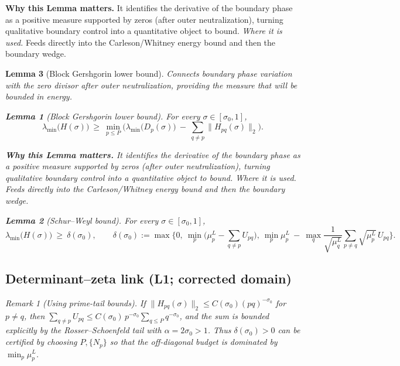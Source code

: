 \documentclass[11pt]{article}
\newtheorem{lemma}{Lemma}[section]
\theoremstyle{definition}
\theoremstyle{remark}
\newtheorem{remark}{Remark}[section]
\begin{document}
  
\vspace{1.0cm}
\noindent\textbf{Why this Lemma matters.} It identifies the derivative of the boundary phase as a positive measure supported by zeros (after outer neutralization), turning qualitative boundary control into a quantitative object to bound.
\noindent\textit{Where it is used.} Feeds directly into the Carleson/Whitney energy bound and then the boundary wedge.
\begin{lemma}[Block Gershgorin lower bound]
 Connects boundary phase variation with the zero divisor after outer neutralization, providing the measure that will be bounded in energy.
\begin{lemma}[Block Gershgorin lower bound]
\label{lem:block-gersh}
For every $\sigma\in[\sigma_0,1]$,
\[
  \lambda_{\min}\big(H(\sigma)\big)\ \ge\ \min_{p\le P}\Big(\lambda_{\min}\big(D_p(\sigma)\big)\ -\ \sum_{q\ne p}\|H_{pq}(\sigma)\|_2\Big).
\]
\end{lemma}




\vspace{1.0cm}
\noindent\textbf{Why this Lemma matters.} It identifies the derivative of the boundary phase as a positive measure supported by zeros (after outer neutralization), turning qualitative boundary control into a quantitative object to bound.
\noindent\textit{Where it is used.} Feeds directly into the Carleson/Whitney energy bound and then the boundary wedge.
\begin{lemma}[Schur--Weyl bound]
\label{lem:schur-weyl-gap}
For every $\sigma\in[\sigma_0,1]$,
\[
  \lambda_{\min}\big(H(\sigma)\big)\ \ge\ \delta(\sigma_0),\qquad \delta(\sigma_0):=\max\Big\{0,\ \min_p\Big(\mu_p^L-\sum_{q\ne p}U_{pq}\Big),\ \min_p \mu_p^L\ -\ \max_q\frac{1}{\sqrt{\mu_q^L}}\sum_{p\ne q}\sqrt{\mu_p^L}\,U_{pq}\Big\}.\]
\end{lemma}






\vspace{1.0cm}
\subsection*{Determinant--zeta link (L1; corrected domain)}

\begin{remark}[Using prime-tail bounds]
If $\|H_{pq}(\sigma)\|_2\le C(\sigma_0)(pq)^{-\sigma_0}$ for $p\ne q$, then $\sum_{q\ne p}U_{pq}\le C(\sigma_0)\,p^{-\sigma_0}\sum_{q\le P} q^{-\sigma_0}$, and the sum is bounded explicitly by the Rosser--Schoenfeld tail with $\alpha=2\sigma_0>1$. Thus $\delta(\sigma_0)>0$ can be certified by choosing $P,\{N_p\}$ so that the off-diagonal budget is dominated by $\min_p\mu_p^L$.
\end{remark}



\end{lemma}
\end{document}
